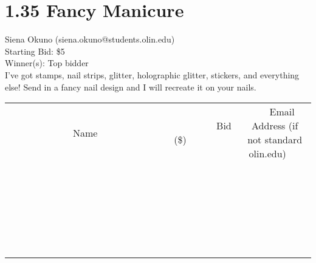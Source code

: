 \documentclass[11pt]{article}
\begin{document}
\section*{1.35 Fancy Manicure}
Siena Okuno (siena.okuno@students.olin.edu) \\
Starting Bid: \$5 \\
Winner(s): 
Top bidder \\
I've got stamps, nail strips, glitter, holographic glitter, stickers, and everything else! Send in a fancy nail design and I will recreate it on your nails. \\[6ex]
\begin{tabular}{c c c}
~~~~~~~~~~~~~Name~~~~~~~~~~~~~ & ~~~~~~~~~Bid (\$)~~~~~~~~~ & ~~~Email Address (if not standard olin.edu)~~~ \\
 & & \\
\hline
 & & \\
\hline
 & & \\
\hline
 & & \\
\hline
 & & \\
\hline
 & & \\
\hline
 & & \\
\hline
 & & \\
\hline
 & & \\
\hline
 & & \\
\hline
 & & \\
\hline
 & & \\
\hline
 & & \\
\hline
 & & \\
\hline
 & & \\
\hline
 & & \\
\hline
 & & \\
\hline
 & & \\
\hline
 & & \\
\hline
 & & \\
\hline
 & & \\
\hline
 & & \\
\hline
 & & \\
\hline
 & & \\
\hline
 & & \\
\hline
 & & \\
\hline
\end{tabular}
\clearpage
\end{document}
